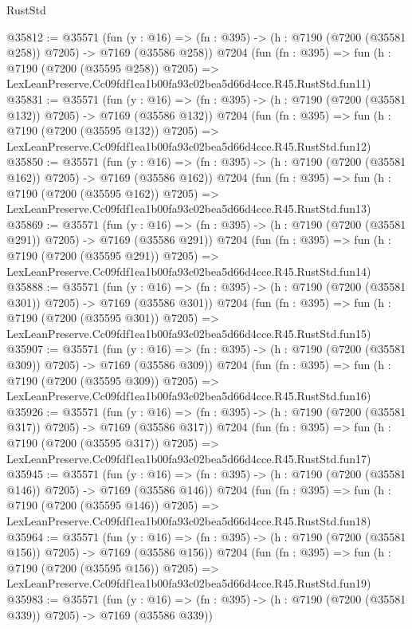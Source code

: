 \begin{lexlean}{RustStd}
\begin{coremodule}
@35812 := @35571
    (fun (y : @16) => (fn : @395) -> (h : @7190 (@7200 (@35581 @258)) @7205) -> @7169 (@35586 @258))
    @7204
    (fun (fn : @395) =>
    fun (h : @7190 (@7200 (@35595 @258)) @7205) =>
    LexLeanPreserve.Cc09fdf1ea1b00fa93c02bea5d66d4cce.R45.RustStd.fun11)
@35831 := @35571
    (fun (y : @16) => (fn : @395) -> (h : @7190 (@7200 (@35581 @132)) @7205) -> @7169 (@35586 @132))
    @7204
    (fun (fn : @395) =>
    fun (h : @7190 (@7200 (@35595 @132)) @7205) =>
    LexLeanPreserve.Cc09fdf1ea1b00fa93c02bea5d66d4cce.R45.RustStd.fun12)
@35850 := @35571
    (fun (y : @16) => (fn : @395) -> (h : @7190 (@7200 (@35581 @162)) @7205) -> @7169 (@35586 @162))
    @7204
    (fun (fn : @395) =>
    fun (h : @7190 (@7200 (@35595 @162)) @7205) =>
    LexLeanPreserve.Cc09fdf1ea1b00fa93c02bea5d66d4cce.R45.RustStd.fun13)
@35869 := @35571
    (fun (y : @16) => (fn : @395) -> (h : @7190 (@7200 (@35581 @291)) @7205) -> @7169 (@35586 @291))
    @7204
    (fun (fn : @395) =>
    fun (h : @7190 (@7200 (@35595 @291)) @7205) =>
    LexLeanPreserve.Cc09fdf1ea1b00fa93c02bea5d66d4cce.R45.RustStd.fun14)
@35888 := @35571
    (fun (y : @16) => (fn : @395) -> (h : @7190 (@7200 (@35581 @301)) @7205) -> @7169 (@35586 @301))
    @7204
    (fun (fn : @395) =>
    fun (h : @7190 (@7200 (@35595 @301)) @7205) =>
    LexLeanPreserve.Cc09fdf1ea1b00fa93c02bea5d66d4cce.R45.RustStd.fun15)
@35907 := @35571
    (fun (y : @16) => (fn : @395) -> (h : @7190 (@7200 (@35581 @309)) @7205) -> @7169 (@35586 @309))
    @7204
    (fun (fn : @395) =>
    fun (h : @7190 (@7200 (@35595 @309)) @7205) =>
    LexLeanPreserve.Cc09fdf1ea1b00fa93c02bea5d66d4cce.R45.RustStd.fun16)
@35926 := @35571
    (fun (y : @16) => (fn : @395) -> (h : @7190 (@7200 (@35581 @317)) @7205) -> @7169 (@35586 @317))
    @7204
    (fun (fn : @395) =>
    fun (h : @7190 (@7200 (@35595 @317)) @7205) =>
    LexLeanPreserve.Cc09fdf1ea1b00fa93c02bea5d66d4cce.R45.RustStd.fun17)
@35945 := @35571
    (fun (y : @16) => (fn : @395) -> (h : @7190 (@7200 (@35581 @146)) @7205) -> @7169 (@35586 @146))
    @7204
    (fun (fn : @395) =>
    fun (h : @7190 (@7200 (@35595 @146)) @7205) =>
    LexLeanPreserve.Cc09fdf1ea1b00fa93c02bea5d66d4cce.R45.RustStd.fun18)
@35964 := @35571
    (fun (y : @16) => (fn : @395) -> (h : @7190 (@7200 (@35581 @156)) @7205) -> @7169 (@35586 @156))
    @7204
    (fun (fn : @395) =>
    fun (h : @7190 (@7200 (@35595 @156)) @7205) =>
    LexLeanPreserve.Cc09fdf1ea1b00fa93c02bea5d66d4cce.R45.RustStd.fun19)
@35983 := @35571
    (fun (y : @16) => (fn : @395) -> (h : @7190 (@7200 (@35581 @339)) @7205) -> @7169 (@35586 @339))

\end{coremodule}
\end{lexlean}
